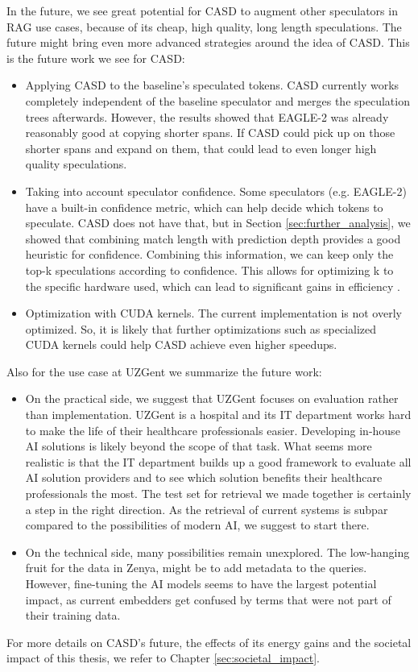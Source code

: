 In the future, we see great potential for CASD to augment other speculators in RAG use cases, because of its cheap, high quality, long length speculations. The future might bring even more advanced strategies around the idea of CASD. This is the future work we see for CASD:
\begin{itemize}
    \item Applying CASD to the baseline's speculated tokens. CASD currently works completely independent of the baseline speculator and merges the speculation trees afterwards. However, the results showed that EAGLE-2 was already reasonably good at copying shorter spans. If CASD could pick up on those shorter spans and expand on them, that could lead to even longer high quality speculations.
    \item Taking into account speculator confidence. Some speculators (e.g. EAGLE-2) have a built-in confidence metric, which can help decide which tokens to speculate. CASD does not have that, but in Section \ref{sec:further_analysis}, we showed that combining match length with prediction depth provides a good heuristic for confidence. Combining this information, we can keep only the top-k speculations according to confidence. This allows for optimizing k to the specific hardware used, which can lead to significant gains in efficiency \cite{fernandez2025energy}.
    \item Optimization with CUDA kernels. The current implementation is not overly optimized. So, it is likely that further optimizations such as specialized CUDA kernels could help CASD achieve even higher speedups.
\end{itemize}

Also for the use case at UZGent we summarize the future work:
\begin{itemize}
    \item On the practical side, we suggest that UZGent focuses on evaluation rather than implementation. UZGent is a hospital and its IT department works hard to make the life of their healthcare professionals easier. Developing in-house AI solutions is likely beyond the scope of that task. What seems more realistic is that the IT department builds up a good framework to evaluate all AI solution providers and to see which solution benefits their healthcare professionals the most. The test set for retrieval we made together is certainly a step in the right direction. As the retrieval of current systems is subpar compared to the possibilities of modern AI, we suggest to start there.
    \item On the technical side, many possibilities remain unexplored. The low-hanging fruit for the data in Zenya, might be to add metadata to the queries. However, fine-tuning the AI models seems to have the largest potential impact, as current embedders get confused by terms that were not part of their training data.
\end{itemize}

For more details on CASD's future, the effects of its energy gains and the societal impact of this thesis, we refer to Chapter \ref{sec:societal_impact}.

